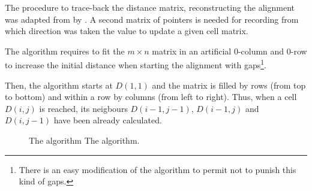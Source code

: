The procedure to trace-back the distance matrix, reconstructing the alignment was adapted from
\citeauthor{needleman:1970a} by \citeauthor{sellers:1974a}. A second matrix of pointers is needed for 
recording from which direction was taken the value to update a given cell matrix.


The \citeauthor{sellers:1974a} algorithm requires to fit the \citeauthor{needleman:1970a} $m \times n$
matrix in an artificial 0-column and 0-row to increase the initial distance when starting the alignment 
with gaps\footnote{There is an easy modification of the algorithm to permit not to punish this kind of 
gaps.}. 

Then, the algorithm starts at $D(1,1)$ and the matrix is filled by rows (from top to bottom) and within a 
row by columns (from left to right). Thus, when a cell $D(i,j)$ is reached, its neigbours $D(i-1,j-1)$, 
$D(i-1,j)$ and $D(i,j-1)$ have been already calculated.

\begin{figure}[t!]
\begin{center}
          {The \citeauthor{sellers:1974a} algorithm}%
          {The \citeauthor{sellers:1974a} algorithm.}%
          {}
\end{center}
\end{figure}

